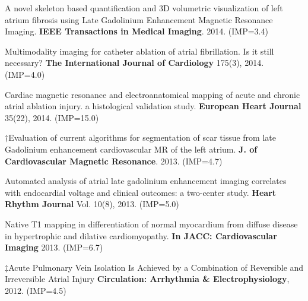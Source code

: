 \begin{etaremune}
\item A novel skeleton based quantification and 3D volumetric visualization of left atrium fibrosis using Late Gadolinium Enhancement Magnetic Resonance Imaging. \textbf{IEEE Transactions in Medical Imaging}. 2014. (IMP=3.4)
\item Multimodality imaging for catheter ablation of atrial fibrillation. Is it still necessary? \textbf{The International Journal of Cardiology} 175(3), 2014. (IMP=4.0)
\item Cardiac magnetic resonance and electroanatomical mapping of acute and chronic atrial ablation injury. a histological validation study. \textbf{European Heart Journal} 35(22), 2014. (IMP=15.0)
\item  $\dagger$Evaluation of current algorithms for segmentation of scar tissue from late Gadolinium enhancement cardiovascular MR of the left atrium. \textbf{J. of Cardiovascular Magnetic Resonance}. 2013. (IMP=4.7)
\item Automated analysis of atrial late gadolinium enhancement imaging correlates with endocardial voltage and clinical outcomes: a two-center study. \textbf{Heart Rhythm Journal} Vol. 10(8), 2013. (IMP=5.0)
\item Native T1 mapping in differentiation of normal myocardium from diffuse disease in hypertrophic and dilative cardiomyopathy. \textbf{In JACC: Cardiovascular Imaging} 2013. (IMP=6.7)
\item $\ddagger$Acute Pulmonary Vein Isolation Is Achieved by a Combination of Reversible and Irreversible Atrial Injury \textbf{Circulation: Arrhythmia \& Electrophysiology}, 2012. (IMP=4.5)

\end{etaremune}
\renewcommand{\theenumi}{C\arabic{enumi}}

